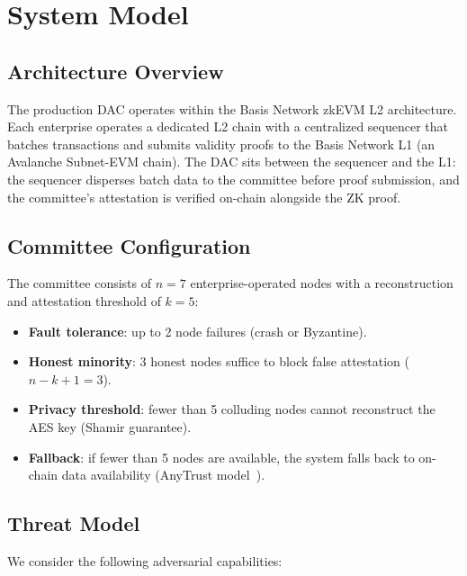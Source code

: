 
\section{System Model}
\label{sec:system-model}

\subsection{Architecture Overview}

The production DAC operates within the Basis Network zkEVM L2
architecture. Each enterprise operates a dedicated L2 chain with a
centralized sequencer that batches transactions and submits validity
proofs to the Basis Network L1 (an Avalanche Subnet-EVM chain). The DAC
sits between the sequencer and the L1: the sequencer disperses batch
data to the committee before proof submission, and the committee's
attestation is verified on-chain alongside the ZK proof.

\subsection{Committee Configuration}

The committee consists of $n = 7$ enterprise-operated nodes with a
reconstruction and attestation threshold of $k = 5$:

\begin{itemize}
  \item \textbf{Fault tolerance}: up to 2 node failures (crash or
    Byzantine).
  \item \textbf{Honest minority}: 3 honest nodes suffice to block false
    attestation ($n - k + 1 = 3$).
  \item \textbf{Privacy threshold}: fewer than 5 colluding nodes cannot
    reconstruct the AES key (Shamir guarantee).
  \item \textbf{Fallback}: if fewer than 5 nodes are available, the
    system falls back to on-chain data availability (AnyTrust
    model~\cite{anytrust}).
\end{itemize}

\subsection{Threat Model}

We consider the following adversarial capabilities:

